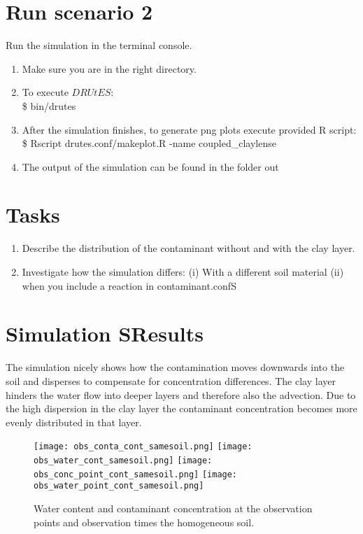 \documentclass[
10pt, %
a4paper, %
oneside, %
headinclude,footinclude, %
BCOR5mm, %
]{scrartcl}
\begin{document}
\section*{Run scenario 2}
Run the simulation in the terminal console.
\begin{enumerate}
	\item Make sure you are in the right directory. 
	\item To execute $DRUtES$: \\
	\$ bin/drutes
	\item After the simulation finishes, to generate png plots execute provided R script: \\
	\$ Rscript drutes.conf/makeplot.R -name coupled\_claylense \\
	\item The output of the simulation can be found in the folder out
\end{enumerate}


\section*{Tasks}

\begin{enumerate}
\item Describe the distribution of the contaminant without and with the clay layer.
\item Investigate how the simulation differs: (i) With a different soil material (ii) when you include a reaction in contaminant.confS
\end{enumerate}

\newpage

\section*{Simulation SResults}

The simulation nicely shows how the contamination moves downwards into the soil and disperses to compensate for concentration differences. The clay layer hinders the water flow into deeper layers and therefore also the advection. Due to the high dispersion in the clay layer the contaminant concentration becomes more evenly distributed in that layer. 


\begin{figure}[!h]
	\centering
	\texttt{[image: obs\_conta\_cont\_samesoil.png]}
	\texttt{[image: obs\_water\_cont\_samesoil.png]}
	\texttt{[image: obs\_conc\_point\_cont\_samesoil.png]}
	\texttt{[image: obs\_water\_point\_cont\_samesoil.png]}
	\caption{Water content  and contaminant concentration at the observation points and observation times the homogeneous soil.}
\end{figure}
\end{document}

